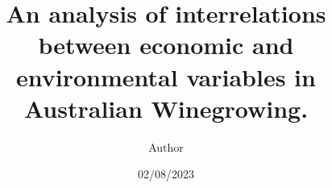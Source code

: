\documentclass[review,12pt,authoryear]{elsarticle}
\begin{document}
\begin{linenumbers}
\begin{frontmatter}




\title{An analysis of interrelations between economic and environmental variables in Australian Winegrowing.}




\author[label1,label2,label3]{Author}
\date{02/08/2023}



\end{frontmatter}
\end{linenumbers}
\end{document}
